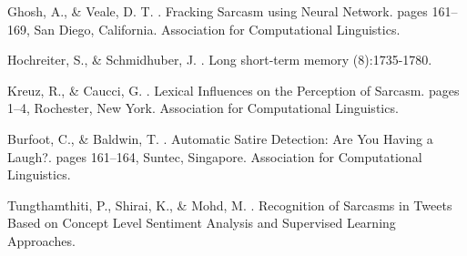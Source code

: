 \documentclass[11pt]{article}
\begin{document}
\begin{thebibliography}{}

Ghosh, A., \& Veale, D. T.
.
\newblock Fracking Sarcasm using Neural Network.
\newblock pages 161–169, San Diego, California. Association for Computational Linguistics.

Hochreiter, S., \& Schmidhuber, J.
.
\newblock Long short-term memory
(8):1735-1780.

Kreuz, R., \& Caucci, G.
.
\newblock Lexical Influences on the Perception of Sarcasm.
\newblock pages 1–4, Rochester, New York. Association for Computational Linguistics.

Burfoot, C., \& Baldwin, T.
.
\newblock Automatic Satire Detection: Are You Having a Laugh?.
\newblock pages 161–164, Suntec, Singapore. Association for Computational Linguistics.

Tungthamthiti, P., Shirai, K., \& Mohd, M.
.
\newblock Recognition of Sarcasms in Tweets Based on Concept Level Sentiment Analysis and Supervised Learning Approaches.

\end{thebibliography}
\end{document}
